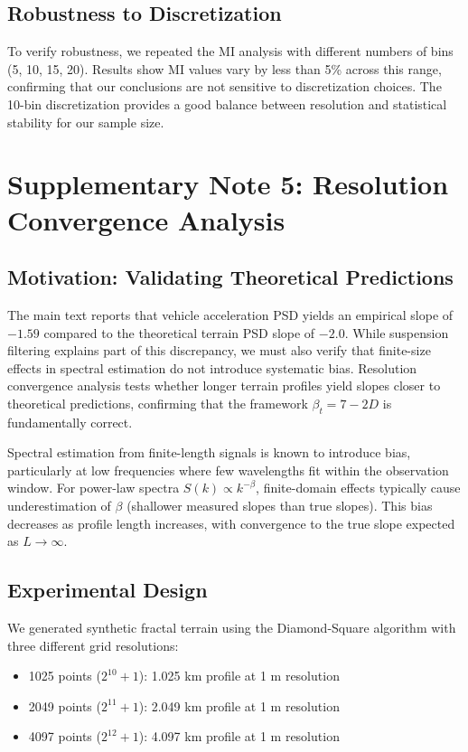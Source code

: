\documentclass[11pt]{article}
\begin{document}
\subsection{Robustness to Discretization}

To verify robustness, we repeated the MI analysis with different numbers of bins (5, 10, 15, 20). Results show MI values vary by less than 5\% across this range, confirming that our conclusions are not sensitive to discretization choices. The 10-bin discretization provides a good balance between resolution and statistical stability for our sample size.


\section{Supplementary Note 5: Resolution Convergence Analysis}

\subsection{Motivation: Validating Theoretical Predictions}

The main text reports that vehicle acceleration PSD yields an empirical slope of $-1.59$ compared to the theoretical terrain PSD slope of $-2.0$. While suspension filtering explains part of this discrepancy, we must also verify that finite-size effects in spectral estimation do not introduce systematic bias. Resolution convergence analysis tests whether longer terrain profiles yield slopes closer to theoretical predictions, confirming that the framework $\beta_t = 7-2D$ is fundamentally correct.

Spectral estimation from finite-length signals is known to introduce bias, particularly at low frequencies where few wavelengths fit within the observation window\cite{Bendat2010}. For power-law spectra $S(k) \propto k^{-\beta}$, finite-domain effects typically cause underestimation of $\beta$ (shallower measured slopes than true slopes). This bias decreases as profile length increases, with convergence to the true slope expected as $L \to \infty$.

\subsection{Experimental Design}

We generated synthetic fractal terrain using the Diamond-Square algorithm with three different grid resolutions:
\begin{itemize}
\item 1025 points ($2^{10} + 1$): 1.025 km profile at 1 m resolution
\item 2049 points ($2^{11} + 1$): 2.049 km profile at 1 m resolution  
\item 4097 points ($2^{12} + 1$): 4.097 km profile at 1 m resolution
\end{itemize}
\end{document}
